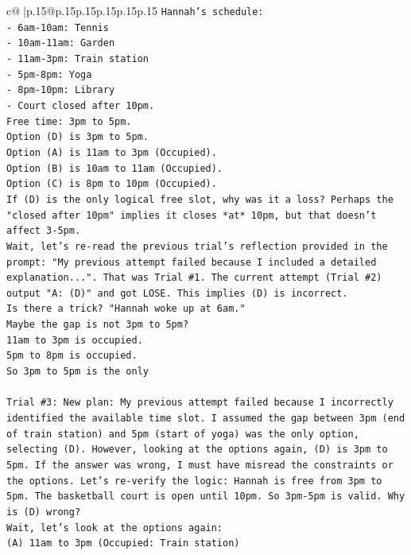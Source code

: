 \documentclass{article}
\begin{document}
{\begin{supertabular}{c@{$\;$}|p{.15\linewidth}@{}p{.15\linewidth}p{.15\linewidth}p{.15\linewidth}p{.15\linewidth}p{.15\linewidth}}
{{{\texttt{Hannah's schedule:} \\
\texttt{{-} 6am{-}10am: Tennis} \\
\texttt{{-} 10am{-}11am: Garden} \\
\texttt{{-} 11am{-}3pm: Train station} \\
\texttt{{-} 5pm{-}8pm: Yoga} \\
\texttt{{-} 8pm{-}10pm: Library} \\
\texttt{{-} Court closed after 10pm.} \\
\texttt{Free time: 3pm to 5pm.} \\
\texttt{Option (D) is 3pm to 5pm.} \\
\texttt{Option (A) is 11am to 3pm (Occupied).} \\
\texttt{Option (B) is 10am to 11am (Occupied).} \\
\texttt{Option (C) is 8pm to 10pm (Occupied).} \\
\texttt{If (D) is the only logical free slot, why was it a loss? Perhaps the "closed after 10pm" implies it closes *at* 10pm, but that doesn't affect 3{-}5pm.} \\
\texttt{Wait, let's re{-}read the previous trial's reflection provided in the prompt: "My previous attempt failed because I included a detailed explanation...". That was Trial \#1. The current attempt (Trial \#2) output "A: (D)" and got LOSE. This implies (D) is incorrect.} \\
\texttt{Is there a trick? "Hannah woke up at 6am."} \\
\texttt{Maybe the gap is not 3pm to 5pm?} \\
\texttt{11am to 3pm is occupied.} \\
\texttt{5pm to 8pm is occupied.} \\
\texttt{So 3pm to 5pm is the only} \\
\\ 
\texttt{Trial \#3: New plan: My previous attempt failed because I incorrectly identified the available time slot. I assumed the gap between 3pm (end of train station) and 5pm (start of yoga) was the only option, selecting (D). However, looking at the options again, (D) is 3pm to 5pm. If the answer was wrong, I must have misread the constraints or the options. Let's re{-}verify the logic: Hannah is free from 3pm to 5pm. The basketball court is open until 10pm. So 3pm{-}5pm is valid. Why is (D) wrong?} \\
\texttt{Wait, let's look at the options again:} \\
\texttt{(A) 11am to 3pm (Occupied: Train station)} \\
}}}
\end{supertabular}}
\end{document}
